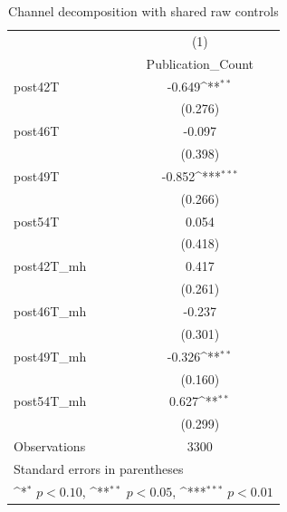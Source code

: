 \begin{table}[htbp]\centering
\def\sym#1{\ifmmode^{#1}\else\(^{#1}\)\fi}
\caption{Channel decomposition with shared raw controls}
\begin{tabular}{l*{1}{c}}
\toprule
                    &\multicolumn{1}{c}{(1)}\\
                    &\multicolumn{1}{c}{Publication\_Count}\\
\midrule
post42T             &      -0.649\sym{**} \\
                    &     (0.276)         \\
\addlinespace
post46T             &      -0.097         \\
                    &     (0.398)         \\
\addlinespace
post49T             &      -0.852\sym{***}\\
                    &     (0.266)         \\
\addlinespace
post54T             &       0.054         \\
                    &     (0.418)         \\
\addlinespace
post42T\_mh          &       0.417         \\
                    &     (0.261)         \\
\addlinespace
post46T\_mh          &      -0.237         \\
                    &     (0.301)         \\
\addlinespace
post49T\_mh          &      -0.326\sym{**} \\
                    &     (0.160)         \\
\addlinespace
post54T\_mh          &       0.627\sym{**} \\
                    &     (0.299)         \\
\midrule
Observations        &        3300         \\
\bottomrule
\multicolumn{2}{l}{\footnotesize Standard errors in parentheses}\\
\multicolumn{2}{l}{\footnotesize \sym{*} \(p<0.10\), \sym{**} \(p<0.05\), \sym{***} \(p<0.01\)}\\
\end{tabular}
\end{table}
